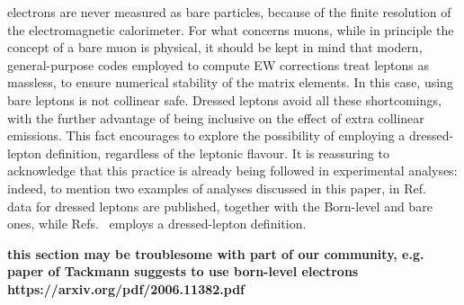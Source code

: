 electrons are never measured as bare particles, because of the finite resolution 
of the electromagnetic calorimeter. For what concerns muons, while in principle the concept of a bare muon is physical, it should be kept in
mind that modern, general-purpose codes employed to
compute EW corrections treat leptons as massless, to ensure numerical stability of the matrix elements. In this case, using bare leptons is not collinear safe.
Dressed leptons avoid all these shortcomings, with the further advantage of being
inclusive on the effect of extra collinear emissions. This fact encourages to explore the possibility of employing a dressed-lepton
definition, regardless of the leptonic flavour. It is reassuring to acknowledge that this practice is already being followed in experimental analyses:
indeed, to mention two examples of analyses discussed in this paper, in Ref.~\cite{Aad:2015auj} data for dressed leptons are published, together with the Born-level
and bare ones, while Refs.~\cite{Sirunyan:2019bzr} employs a dressed-lepton definition.

{\bf this section may be troublesome with part of our community, e.g. paper of Tackmann suggests to use born-level electrons https://arxiv.org/pdf/2006.11382.pdf}
